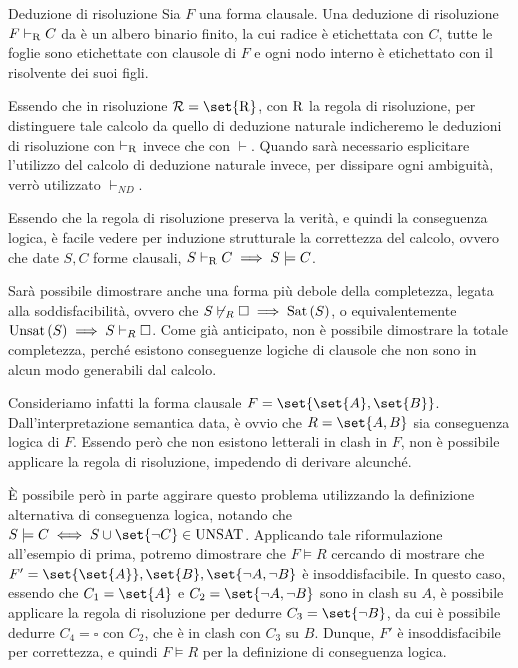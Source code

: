\begin{definition}{Deduzione di risoluzione}
  Sia \(F\) una forma clausale. Una deduzione di risoluzione \(F\vdash_{\operatorname{R} }C\) da è un albero binario finito, la cui radice è etichettata con \(C\), tutte le foglie sono etichettate con clausole di \(F\) e ogni nodo interno è etichettato con il risolvente dei suoi figli.
\end{definition}

\begin{note}{}
  Essendo che in risoluzione \(\Rules = \set{\Rule}\), con \(\operatorname{R}\) la regola di risoluzione, per distinguere tale calcolo da quello di deduzione naturale indicheremo le deduzioni di risoluzione con \(\vdash_{\operatorname{R}}\) invece che con \(\vdash\). Quando sarà necessario esplicitare l'utilizzo del calcolo di deduzione naturale invece, per dissipare ogni ambiguità, verrò utilizzato \(\vdash_{ND}\).
\end{note}

Essendo che la regola di risoluzione preserva la verità, e quindi la conseguenza logica, è facile vedere per induzione strutturale la correttezza del calcolo, ovvero che date \(S,C\) forme clausali, \(S\vdash_{\operatorname{R}} C \implies S\models C\).

Sarà possibile dimostrare anche una forma più debole della completezza, legata alla soddisfacibilità, ovvero che \(S\not\vdash_R \square \implies \Sat[S]\), o equivalentemente \(\Unsat[S] \implies S\vdash_R \square\). Come già anticipato, non è possibile dimostrare la totale completezza, perché esistono conseguenze logiche di clausole che non sono in alcun modo generabili dal calcolo.

Consideriamo infatti la forma clausale \(F = \set{\set{A},\set{B}}\). Dall'interpretazione semantica data, è ovvio che \(R=\set{A,B}\) sia conseguenza logica di \(F\). Essendo però che non esistono letterali in clash in \(F\), non è possibile applicare la regola di risoluzione, impedendo di derivare alcunché.

È possibile però in parte aggirare questo problema utilizzando la definizione alternativa di conseguenza logica, notando che \(S\models C \iff S\cup\set{\neg C} \in \Unsat\).
Applicando tale riformulazione all'esempio di prima, potremo dimostrare che \(F\models R\) cercando di mostrare che \(F' = \set{\set{A}}, \set{B}, \set{\neg A, \neg B}\) è insoddisfacibile. In questo caso, essendo che \(C_1 = \set{A}\) e \(C_2 = \set{\neg A, \neg B}\) sono in clash su \(A\), è possibile applicare la regola di risoluzione per dedurre \(C_3 = \set{\neg B}\), da cui è possibile dedurre \(C_4 = \square\) con \(C_2\), che è in clash con \(C_3\) su \(B\). Dunque, \(F'\) è insoddisfacibile per correttezza, e quindi \(F\models R\) per la definizione di conseguenza logica.

